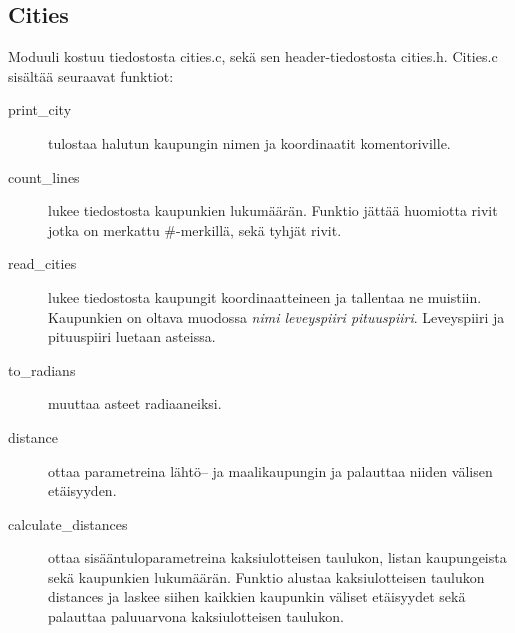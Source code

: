 \documentclass[12pt]{article}
\numberwithin{equation}{section}
\numberwithin{table}{section}
\begin{document}
\subsection{Cities}
Moduuli kostuu tiedostosta cities.c, sekä sen header-tiedostosta cities.h. Cities.c sisältää seuraavat funktiot:
\begin{description}
\item[print\_city] tulostaa halutun kaupungin nimen ja koordinaatit komentoriville. 
\item[count\_lines] lukee tiedostosta kaupunkien lukumäärän. Funktio jättää huomiotta rivit jotka on merkattu \#-merkillä, sekä tyhjät rivit.
\item[read\_cities] lukee tiedostosta kaupungit koordinaatteineen ja tallentaa ne muistiin. Kaupunkien on oltava muodossa \emph{nimi leveyspiiri pituuspiiri}. Leveyspiiri ja pituuspiiri luetaan asteissa.
\item[to\_radians] muuttaa asteet radiaaneiksi.
\item[distance] ottaa parametreina lähtö-- ja maalikaupungin ja palauttaa niiden välisen etäisyyden.
\item[calculate\_distances] ottaa sisääntuloparametreina kaksiulotteisen taulukon, listan kaupungeista sekä kaupunkien lukumäärän. Funktio alustaa kaksiulotteisen taulukon distances ja laskee siihen kaikkien kaupunkin väliset etäisyydet sekä palauttaa paluuarvona kaksiulotteisen taulukon.

\end{description}
\end{document}
